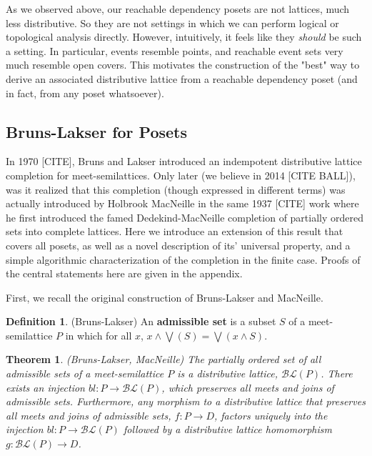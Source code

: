 \documentclass[hoptionsi,review,format=acmsmall]{acmart}
\newtheorem{theorem}{Theorem}[section]
\theoremstyle{definition}
\newtheorem{definition}{Definition}[section]
\newcommand{\BLc}{\mathcal{BL}}
\begin{document}
As we observed above, our reachable dependency posets are not lattices, much less distributive. So they are not settings in which we can perform logical or topological analysis directly. However, intuitively, it feels like they \textit{should} be such a setting. In particular, events resemble points, and reachable event sets very much resemble open covers. This motivates the construction of the "best" way to derive an associated distributive lattice from a reachable dependency poset (and in fact, from any poset whatsoever).

\subsection{Bruns-Lakser for Posets}

In 1970 [CITE], Bruns and Lakser introduced an indempotent distributive lattice completion for meet-semilattices. Only later (we believe in 2014 [CITE BALL]), was it realized that this completion (though expressed in different terms) was actually introduced by  Holbrook MacNeille in the same 1937 [CITE] work where he first introduced the famed Dedekind-MacNeille completion of partially ordered sets into complete lattices. Here we introduce an extension of this result that covers all posets, as well as a novel description of its' universal property, and a simple algorithmic characterization of the completion in the finite case. Proofs of the central statements here are given in the appendix.

First, we recall the original construction of Bruns-Lakser and MacNeille.

\begin{definition}
(Bruns-Lakser) An \textbf{admissible set} is a subset \(S\) of a meet-semilattice \(P\) in which for all \(x\), \(x \wedge \bigvee(S) = \bigvee(x \wedge S)\).
\end{definition}

\begin{theorem}
(Bruns-Lakser, MacNeille) The partially ordered set of all admissible sets of a meet-semilattice \(P\) is a distributive lattice, \(\BLc(P)\). There exists an injection \(bl : P \rightarrow \BLc(P)\), which preserves all meets and joins of admissible sets. Furthermore, any morphism to a distributive lattice that preserves all meets and joins of admissible sets, \(f : P \rightarrow D\), factors uniquely into the injection \(bl : P \rightarrow \BLc(P)\) followed by a distributive lattice homomorphism \(g : \BLc(P) \rightarrow D\).
\end{theorem}
\end{document}
